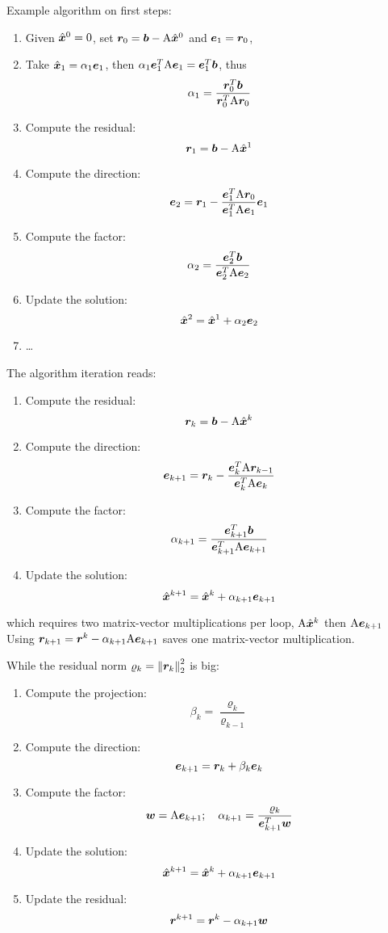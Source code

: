 \medskip
Example algorithm on first steps:
\begin{enumerate}
\item Given $\hx^0 = 0$, set $\rr_0 = \bb - \mA \hx^0$ and $\ee_1 = \rr_0$,
\item Take $\hx_1 = \alpha_1 \ee_1$, then $\alpha_1\ee_1^T \mA \ee_1 = \ee_1^T \bb$, thus
\[
\alpha_1 = \frac{\rr^T_0\bb}{\rr^T_0\mA\rr_0}
\]
\item Compute the residual:
\[
\rr_1 = \bb - \mA \hx^1
\]
\item Compute the direction:
\[
\ee_{2} = \rr_1 - \frac{\ee^T_1\mA\rr_{0}}{\ee^T_1\mA\ee_1}\ee_1
\]
\item Compute the factor:
\[
\alpha_2 = \frac{\ee^T_2\bb}{\ee^T_2\mA\ee_2}
\]
\item Update the solution:
\[
\hx^2 = \hx^1 + \alpha_2 \ee_2
\]
\item \dots
\end{enumerate}

\medskip
The algorithm iteration reads:
\begin{enumerate}
\item Compute the residual:
\[
\rr_k = \bb - \mA \hx^{k}
\]
\item Compute the direction:
\[
\ee_{k+1} = \rr_k - \frac{\ee^T_{k}\mA\rr_{k-1}}{\ee^T_k\mA\ee_k}
\]
\item Compute the factor:
\[
\alpha_{k+1} = \frac{\ee^T_{k+1}\bb}{\ee^T_{k+1}\mA\ee_{k+1}}
\]
\item Update the solution:
\[
\hx^{k+1} = \hx^k + \alpha_{k+1} \ee_{k+1}
\]\end{enumerate}
which requires two matrix-vector multiplications per loop, $\mA\hx^{k}$ then $\mA\ee_{k+1}$
Using $\rr_{k+1} = \rr^k - \alpha_{k+1}\mA\ee_{k+1}$ saves one matrix-vector multiplication.


\medskip
While the residual norm $\varrho_k = \norm{\rr_k}^2_2$ is big:
\begin{enumerate}
\item Compute the projection:
\[
\beta_k = \frac{\varrho_k}{\varrho_{k-1}}
\]
\item Compute the direction:
\[
\ee_{k+1} = \rr_k + \beta_k\ee_k
\]
\item Compute the factor:
\[
\ww = \mA\ee_{k+1};\quad \alpha_{k+1} = \frac{\varrho_k}{\ee^T_{k+1}\ww}
\]
\item Update the solution:
\[
\hx^{k+1} = \hx^k + \alpha_{k+1} \ee_{k+1}
\]
\item Update the residual:
\[
\rr^{k+1} = \rr^k - \alpha_{k+1} \ww
\]
\end{enumerate}

